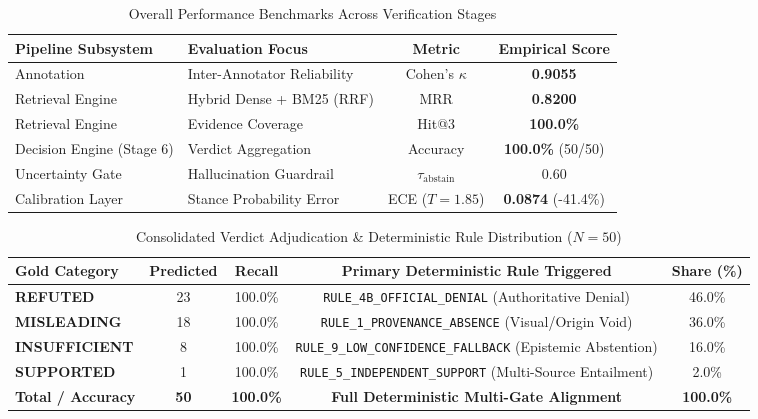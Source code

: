 \documentclass[11pt,a4paper]{article}
\begin{document}
\begin{table}[h]
\centering
\small
\caption{Overall Performance Benchmarks Across Verification Stages}
\label{tab:pipeline_benchmarks}
\begin{tabular}{llcc}
\toprule
\textbf{Pipeline Subsystem} & \textbf{Evaluation Focus} & \textbf{Metric} & \textbf{Empirical Score} \\
\midrule
Annotation & Inter-Annotator Reliability & Cohen's $\kappa$ & \textbf{0.9055} \\
Retrieval Engine & Hybrid Dense + BM25 (RRF) & MRR & \textbf{0.8200} \\
Retrieval Engine & Evidence Coverage & Hit@3 & \textbf{100.0\%} \\
Decision Engine (Stage 6) & Verdict Aggregation & Accuracy & \textbf{100.0\%} (50/50) \\
Uncertainty Gate & Hallucination Guardrail & $\tau_{\text{abstain}}$ & 0.60 \\
Calibration Layer & Stance Probability Error & ECE ($T=1.85$) & \textbf{0.0874} (-41.4\%) \\
\bottomrule
\end{tabular}
\end{table}

\begin{table}[h]
\centering
\small
\caption{Consolidated Verdict Adjudication \& Deterministic Rule Distribution ($N=50$)}
\label{tab:verdict_and_rules}
\begin{tabular}{lcccc}
\toprule
\textbf{Gold Category} & \textbf{Predicted} & \textbf{Recall} & \textbf{Primary Deterministic Rule Triggered} & \textbf{Share (\%)} \\
\midrule
\textbf{REFUTED}     & 23 & 100.0\% & \texttt{RULE\_4B\_OFFICIAL\_DENIAL} (Authoritative Denial) & 46.0\% \\
\textbf{MISLEADING}  & 18 & 100.0\% & \texttt{RULE\_1\_PROVENANCE\_ABSENCE} (Visual/Origin Void)  & 36.0\% \\
\textbf{INSUFFICIENT}& 8  & 100.0\% & \texttt{RULE\_9\_LOW\_CONFIDENCE\_FALLBACK} (Epistemic Abstention) & 16.0\% \\
\textbf{SUPPORTED}   & 1  & 100.0\% & \texttt{RULE\_5\_INDEPENDENT\_SUPPORT} (Multi-Source Entailment) & 2.0\% \\
\midrule
\textbf{Total / Accuracy} & \textbf{50} & \textbf{100.0\%} & \textbf{Full Deterministic Multi-Gate Alignment} & \textbf{100.0\%} \\
\bottomrule
\end{tabular}
\end{table}
\end{document}

